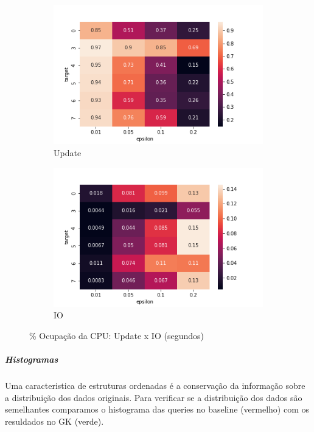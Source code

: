 \documentclass[11pt]{article}
\begin{document}
\begin{figure}[H]
\begin{subfigure}{.5\textwidth}
  \centering
  \includegraphics[width=.9\linewidth]{../../img/QUANTIL_heatmap_PROC_UPDATE.png}
  \caption{Update}
  \label{fig:sub-first}
\end{subfigure}
\begin{subfigure}{.5\textwidth}
  \centering
  \includegraphics[width=.9\linewidth]{../../img/QUANTIL_heatmap_PROC_JAVAIO.png}
  \caption{IO}
\end{subfigure}
\caption{\% Ocupação da CPU: Update x IO (segundos)}
\end{figure}

\newpage

\subparagraph{Histogramas}

Uma caracteristica de estruturas ordenadas é a conservação da informação sobre a distribuição dos dados originais. Para verificar se a distribuição dos dados são semelhantes comparamos o histograma das queries no baseline (vermelho) com os resuldados no GK (verde).
\end{document}
